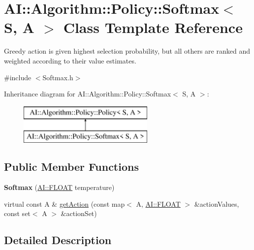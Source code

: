 \hypertarget{classAI_1_1Algorithm_1_1Policy_1_1Softmax}{\section{A\+I\+:\+:Algorithm\+:\+:Policy\+:\+:Softmax$<$ S, A $>$ Class Template Reference}
\label{classAI_1_1Algorithm_1_1Policy_1_1Softmax}
}


Greedy action is given highest selection probability, but all others are ranked and weighted according to their value estimates.  




{\ttfamily \#include $<$Softmax.\+h$>$}

Inheritance diagram for A\+I\+:\+:Algorithm\+:\+:Policy\+:\+:Softmax$<$ S, A $>$\+:\begin{figure}[H]
\begin{center}
\leavevmode
\includegraphics[height=2.000000cm]{classAI_1_1Algorithm_1_1Policy_1_1Softmax}
\end{center}
\end{figure}
\subsection*{Public Member Functions}
\begin{DoxyCompactItemize}
\item 
\hypertarget{classAI_1_1Algorithm_1_1Policy_1_1Softmax_a7f91fab0a3e3ae62fda6851f23170e9e}{{\bfseries Softmax} (\hyperlink{namespaceAI_a41b74884a20833db653dded3918e05c3}{A\+I\+::\+F\+L\+O\+A\+T} temperature)}\label{classAI_1_1Algorithm_1_1Policy_1_1Softmax_a7f91fab0a3e3ae62fda6851f23170e9e}

\item 
virtual const A \& \hyperlink{classAI_1_1Algorithm_1_1Policy_1_1Softmax_adf507bcadedab2d33e3fcc0059918d19}{get\+Action} (const map$<$ A, \hyperlink{namespaceAI_a41b74884a20833db653dded3918e05c3}{A\+I\+::\+F\+L\+O\+A\+T} $>$ \&action\+Values, const set$<$ A $>$ \&action\+Set)
\end{DoxyCompactItemize}


\subsection{Detailed Description}
